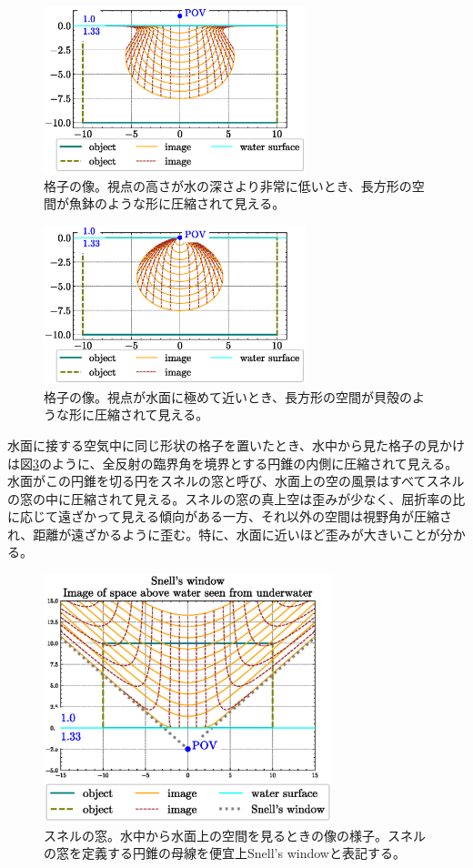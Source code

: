 \documentclass[twocolumn]{article}
\begin{document}
\begin{figure}[!t]
	\centering
	\includegraphics[width=3in]{figs/fishjar.eps}
	\caption{格子の像。視点の高さが水の深さより非常に低いとき、長方形の空間が魚鉢のような形に圧縮されて見える。}
	\label{fig:fishbowl}
\end{figure}

\begin{figure}[!t]
	\centering
	\includegraphics[width=3in]{figs/seashell_shape.eps}
	\caption{格子の像。視点が水面に極めて近いとき、長方形の空間が貝殻のような形に圧縮されて見える。}
	\label{fig:seashell}
\end{figure}

水面に接する空気中に同じ形状の格子を置いたとき、水中から見た格子の見かけは図\ref{fig:snell_window}のように、全反射の臨界角を境界とする円錐の内側に圧縮されて見える。水面がこの円錐を切る円をスネルの窓と呼び、水面上の空の風景はすべてスネルの窓の中に圧縮されて見える。スネルの窓の真上空は歪みが少なく、屈折率の比に応じて遠ざかって見える傾向がある一方、それ以外の空間は視野角が圧縮され、距離が遠ざかるように歪む。特に、水面に近いほど歪みが大きいことが分かる。

\begin{figure}
	\centering
	\includegraphics[width=3.3in]{figs/snell_window.eps}
	\caption{スネルの窓。水中から水面上の空間を見るときの像の様子。スネルの窓を定義する円錐の母線を便宜上Snell's windowと表記する。}
	\label{fig:snell_window}
\end{figure}
\end{document}

